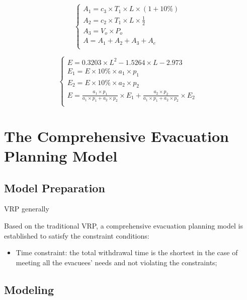 \documentclass{mcmthesis}
\begin{document}
			\begin{equation}
			\left\{
			\begin{array}{lr}

A_1=c_3 \times T_1\times L \times (1+10\%) &\\
A_2=c_2  \times T_1 \times L \times  \frac{1}{2} &\\
A_3=V_o  \times P_o &\\
A=A_1+A_2+A_3+A_e \\		
			\end{array}
			\right.
			\end{equation}



\begin{equation}
\left\{
\begin{array}{lr}
E= 0.3203\times L^2 -1.5264\times L -  2.973&\\
E_1=E \times 10\% \times a_1 \times p_1 &\\
E_2=E\times 10\% \times a_2 \times p_2 &\\
E= \frac{a_1 \times p_1}{a_1 \times p_1+ a_2 \times p_2} \times E_1 + \frac{a_2 \times p_2}{a_1 \times p_1+ a_2 \times p_2} \times E_2\\

\end{array}
\right.
\end{equation}



\section{The Comprehensive Evacuation Planning Model}
\subsection{Model Preparation}


VRP \cite{Dikas2016Solving,He2015Model} generally 


Based on the traditional VRP, a comprehensive evacuation planning model is established to satisfy the constraint conditions:

\begin{itemize}
  \item Time constraint: the total withdrawal time is the shortest in the case of meeting all the evacuees' needs and not violating the constraints;
\end{itemize}

\subsection{Modeling}
\end{document}
